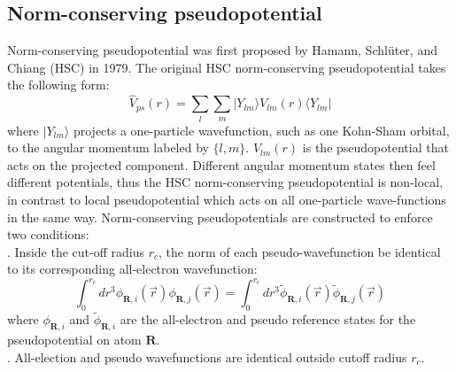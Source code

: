 \documentclass[UTF8]{ctexart}
\begin{document}
        \subsection{Norm-conserving pseudopotential}
        \indent Norm-conserving pseudopotential was first proposed by Hamann, Schlüter, and Chiang (HSC) in 1979. The original HSC
        norm-conserving pseudopotential takes the following form:
        \begin{equation}
            \hat{V}_{ps}(r)=\sum _{l}\sum _{m}|Y_{lm}\rangle V_{lm}(r)\langle Y_{lm}|
        \end{equation}
        where $|Y_{lm}\rangle$ projects a one-particle wavefunction, such as one Kohn-Sham orbital, to the angular momentum labeled by
        $\{l,m\}$. $V_{lm}(r)$ is the pseudopotential that acts on the projected component. Different angular momentum states then feel
        different potentials, thus the HSC norm-conserving pseudopotential is non-local, in contrast to local pseudopotential which acts
        on all one-particle wave-functions in the same way. Norm-conserving pseudopotentials are constructed to enforce two conditions:\\
        . Inside the cut-off radius $r_c$, the norm of each pseudo-wavefunction be identical to its corresponding all-electron wavefunction:
        \begin{equation}
            \int_0^{r_c}dr^3\phi_{\mathbf{R},i}({\vec{r}})\phi_{\mathbf{R},j}({\vec{r}})=
            \int_0^{r_c}dr^{3}{\tilde{\phi}}_{\mathbf{R},i}({\vec{r}}){\tilde{\phi}}_{\mathbf{R},j}({\vec{r}})
        \end{equation}
        where $\phi_{\mathbf{R},i}$ and $\tilde{\phi}_{\mathbf{R},i}$ are the all-electron and pseudo reference states for the pseudopotential
        on atom $\mathbf{R}$.\\
        . All-election and pseudo wavefunctions are identical outside cutoff radius $r_c$.
\end{document}
